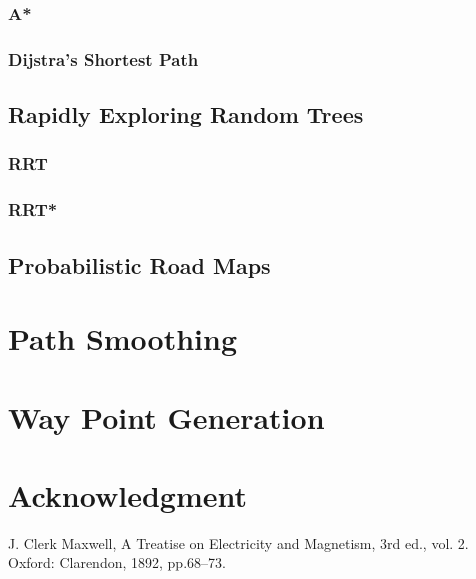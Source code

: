 \documentclass[journal]{IEEEtran}
\begin{document}
\subsubsection{A*}

\subsubsection{Dijstra's Shortest Path}

\subsection{Rapidly Exploring Random Trees}

\subsubsection{RRT}

\subsubsection{RRT*}

\subsection{Probabilistic Road Maps}


\section{Path Smoothing}

\section{Way Point Generation}

\section{Acknowledgment}

\begin{thebibliography}{00}
 J. Clerk Maxwell, A Treatise on Electricity and Magnetism, 3rd ed., vol. 2. Oxford: Clarendon, 1892, pp.68--73.
\end{thebibliography}
\vspace{12pt}
\end{document}
